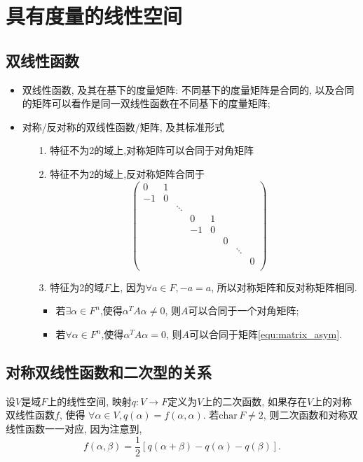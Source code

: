 \section{具有度量的线性空间}
\subsection{双线性函数}
\begin{itemize}
    \item 双线性函数, 及其在基下的度量矩阵: 不同基下的度量矩阵是合同的,
    以及合同的矩阵可以看作是同一双线性函数在不同基下的度量矩阵;
    \item 对称/反对称的双线性函数/矩阵, 及其标准形式
    \begin{itemize}
        \item[1.] 特征不为2的域上,对称矩阵可以合同于对角矩阵
        \item[2.] 特征不为2的域上,反对称矩阵合同于
        \begin{equation}
        \begin{pmatrix}
        0&1\\
        -1&0\\
        &&\ddots\\
        &&&0&1\\
        &&&-1&0\\
        &&&&&0\\
        &&&&&&\ddots\\
        &&&&&&&0\\
        \end{pmatrix}
        \label{equ:matrix_asym}
        \end{equation}
        \item[3.] 特征为2的域$F$上, 因为$\forall a\in F, -a=a$, 
        所以对称矩阵和反对称矩阵相同.
        \begin{itemize}
            \item 若$\exists \alpha \in F^n$,使得$\alpha^T A \alpha \ne 0$,
                  则$A$可以合同于一个对角矩阵;
            \item 若$\forall \alpha \in F^n$,使得$\alpha^T A \alpha = 0$,
                  则$A$可以合同于矩阵\ref{equ:matrix_asym}.
        \end{itemize}
    \end{itemize}
\end{itemize}

\subsection{对称双线性函数和二次型的关系}
设$V$是域$F$上的线性空间, 映射$q: V\rightarrow F$定义为$V$上的二次函数,
如果存在$V$上的对称双线性函数$f$, 使得
$\forall \alpha \in V,q(\alpha) = f(\alpha, \alpha)$.
若$\mathrm{char}\,F \ne 2$,
则二次函数和对称双线性函数一一对应, 因为注意到,
\begin{equation}
\nonumber
f(\alpha, \beta) = 
\frac{1}{2}[q(\alpha+\beta) - q(\alpha) - q(\beta)].
\end{equation}

